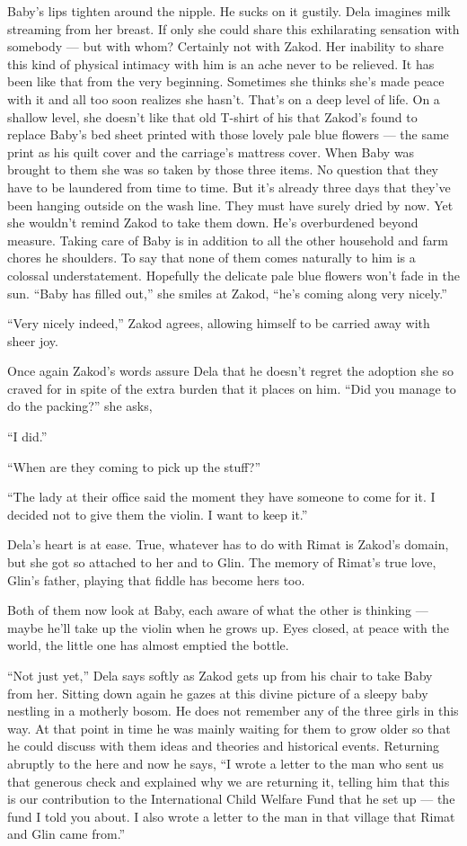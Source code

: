 \documentclass[twoside,11pt,openany]{book}
\begin{document}
Baby's lips tighten around the nipple. He sucks on it gustily. Dela imagines milk streaming from her breast.  If only
she could share this exhilarating sensation with somebody --- but with whom? Certainly not with Zakod. Her inability to share
this kind of physical intimacy with him is an ache never to be relieved. It has been like that from the very
beginning. Sometimes she thinks she's made peace with it and all too soon realizes she hasn't. That's on a deep level
of life. On a shallow level, she doesn't like that old T-shirt of his that Zakod's found to replace Baby's bed
sheet printed with those lovely pale blue flowers --- the same print as his quilt cover and the carriage's mattress
cover. When Baby was brought to them she was so taken by those three items. No question that they have to be laundered
from time to time. But it's already three days that they've been hanging outside on the wash line. They must have
surely dried by now. Yet she wouldn't remind Zakod to take them down. He's overburdened beyond measure. Taking care
of Baby is in addition to all the other household and farm chores he shoulders. To say that none of them comes naturally to
him is a colossal understatement. Hopefully the delicate pale blue flowers won't fade in the sun. ``Baby
has filled out,'' she smiles at Zakod, ``he's coming along very nicely.''

``Very nicely indeed,'' Zakod agrees, allowing himself to be carried away with sheer joy.

Once again Zakod's words assure Dela that he doesn't regret the adoption she so craved for in spite of the extra burden
that it places on him. ``Did you manage to do the packing?'' she asks,

``I did.''

``When are they coming to pick up the stuff?''

``The lady at their office said the moment they have someone to come for it. I decided not to give them the
violin. I want to keep it.''

Dela's heart is at ease. True, whatever has to do with Rimat is Zakod's domain, but she got so attached to her and to
Glin. The memory of Rimat's true love, Glin's father, playing that fiddle has become hers too.

Both of them now look at Baby, each aware of what the other is thinking --- maybe he'll take up the violin when he grows
up. Eyes closed, at peace with the world, the little one has almost emptied the bottle.

``Not just yet,'' Dela says softly as Zakod gets up from his chair to take Baby from her.
Sitting down again he gazes at this divine picture of a sleepy baby nestling in a motherly bosom. He does not remember
any of the three girls in this way. At that point in time he was mainly waiting for them to grow older so that he
could discuss with them ideas and theories and historical events. Returning abruptly to the here and now he says,
``I wrote a letter to the man who sent us that generous check and explained why we are returning it,
telling him that this is our contribution to the International Child Welfare Fund that he set up --- the fund I told you
about.  I also wrote a letter to the man in that village that Rimat and Glin came from.''
\end{document}
